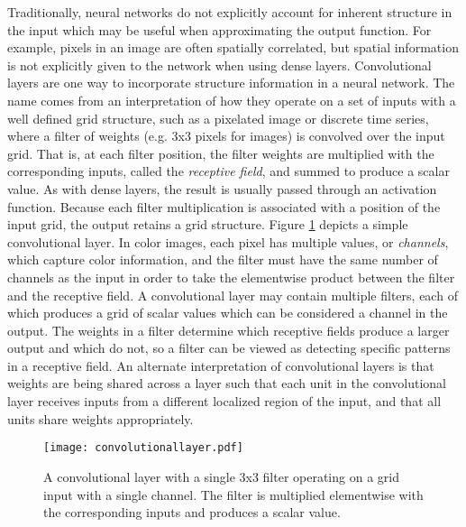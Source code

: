 Traditionally, neural networks do not explicitly account for inherent structure in the input which may be useful when approximating the output function.
For example, pixels in an image are often spatially correlated, but spatial information is not explicitly given to the network when using dense layers.
Convolutional layers are one way to incorporate structure information in a neural network. 
The name comes from an interpretation of how they operate on a set of inputs with a well defined grid structure, such as a pixelated image or discrete time series, where a filter of weights (e.g. 3x3 pixels for images) is convolved over the input grid.
That is, at each filter position, the filter weights are multiplied with the corresponding inputs, called the \textit{receptive field}, and summed to produce a scalar value.
As with dense layers, the result is usually passed through an activation function.
Because each filter multiplication is associated with a position of the input grid, the output retains a grid structure.
Figure \ref{fig:convolutionallayer} depicts a simple convolutional layer.
In color images, each pixel has multiple values, or \textit{channels}, which capture color information, and the filter must have the same number of channels as the input in order to take the elementwise product between the filter and the receptive field.
A convolutional layer may contain multiple filters, each of which produces a grid of scalar values which can be considered a channel in the output.
The weights in a filter determine which receptive fields produce a larger output and which do not, so a filter can be viewed as detecting specific patterns in a receptive field.
An alternate interpretation of convolutional layers is that weights are being shared across a layer such that each unit in the convolutional layer receives inputs from a different localized region of the input, and that all units share weights appropriately.


\begin{figure}
	\centering
	\texttt{[image: convolutionallayer.pdf]}
	\caption{A convolutional layer with a single 3x3 filter operating on a grid input with a single channel. The filter is multiplied elementwise with the corresponding inputs and produces a scalar value.}
	\label{fig:convolutionallayer}
\end{figure}



